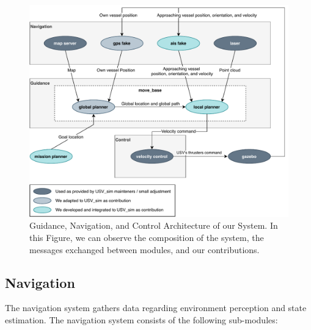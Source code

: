     \begin{figure}
        \centering
        \includegraphics[scale=0.9]{figs/Chap4/usv_arch.pdf}
        \caption{Guidance, Navigation, and Control Architecture of our System. In this Figure, we can observe the composition of the system, the messages exchanged between modules, and our contributions.}
        \label{fig:gnc_arch}
    \end{figure}
    
        \subsection{Navigation}
    \label{sec:chap4_navigation}
    The navigation system gathers data regarding environment perception and state estimation. The navigation system consists of the following sub-modules:
    
